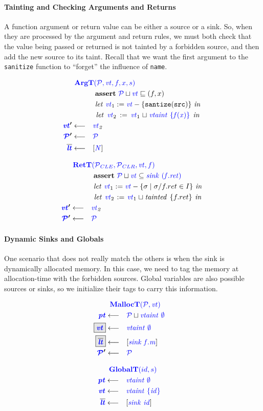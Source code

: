 \documentclass{llncs}
\begin{document}
\paragraph{Tainting and Checking Arguments and Returns}

A function argument or return value can be either a source or a sink.
So, when they are processed by the argument and return rules,
we must both check that the value being passed or returned is not tainted by a forbidden
source, and then add the new source to its taint. Recall that we want the first argument to
the {\tt sanitize} function to ``forget'' the influence of {\tt name}.

\begin{minipage}[t]{.49\textwidth}
  \[\begin{aligned}
  \truledef{\argt}
  \assert{\PCT \sqcup \vt \sqsubseteq (f, x)}
  \letin{\vt_1 := \vt - \{\mathtt{santize(src)}\}}
  \letin{\vt_2 := \vt_1 \sqcup \vtaint{\{f(x)\}}}
  \settag{\vt'}{\vt_2}
  \settag{\PCT'}{\PCT}
  \settag{\lts}{\left[\N\right]}
  \end{aligned}\]
\end{minipage}
\begin{minipage}[t]{.49\textwidth}
  \[\begin{aligned}
  \truledef{\rett}
  \assert{\PCT \sqcup \vt \subseteq \sink{(f.ret)}}
  \letin{\vt_1 := \vt - \{\sigma \mid \sigma / f.ret \in I \}}
  \letin{\vt_2 := \vt_1 \sqcup \mathit{tainted} ~ \{f.ret\}}
  \settag{\vt'}{\vt_2}
  \settag{\PCT'}{\PCT}
  \end{aligned}\]
\end{minipage}

\paragraph{Dynamic Sinks and Globals}

One scenario that does not really match the others is when the sink is dynamically allocated
memory. In this case, we need to tag the memory at allocation-time with the forbidden
sources. Global variables are also possible sources or sinks, so we initialize their
tags to carry this information.

\begin{minipage}[t]{0.49\textwidth}
\[\begin{aligned}
\truledef{\malloct}
\settag{\pt}{\PCT \sqcup \vtaint{\emptyset}}
\settagopt{\vt}{\vtaint{\emptyset}}
\settagopt{\overline{\lt}}{\left[\sink{f.m}\right]}
\settag{\PCT'}{\PCT}
\end{aligned}\]
\end{minipage}
\begin{minipage}[t]{0.49\textwidth}
\[\begin{aligned}
\truledef{\globalt}
\settag{\pt}{\vtaint{\emptyset}}
\settag{\vt}{\vtaint{\{id\}}}
\settag{\overline{\lt}}{\left[\sink{id}\right]}
\end{aligned}\]
\end{minipage}
\end{document}
